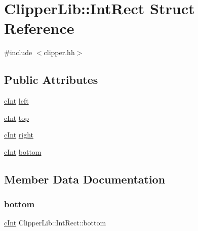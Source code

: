 \hypertarget{struct_clipper_lib_1_1_int_rect}{}\section{Clipper\+Lib\+::Int\+Rect Struct Reference}
\label{struct_clipper_lib_1_1_int_rect}


{\ttfamily \#include $<$clipper.\+hh$>$}

\subsection*{Public Attributes}
\begin{DoxyCompactItemize}
\item 
\mbox{\hyperlink{namespace_clipper_lib_a7156730a24951629192d4831334bafaa}{c\+Int}} \mbox{\hyperlink{struct_clipper_lib_1_1_int_rect_a9bf519994ffc7d1d5752fb1e2411b4cd}{left}}
\item 
\mbox{\hyperlink{namespace_clipper_lib_a7156730a24951629192d4831334bafaa}{c\+Int}} \mbox{\hyperlink{struct_clipper_lib_1_1_int_rect_a07154695bf2313182400f829ba07c3a9}{top}}
\item 
\mbox{\hyperlink{namespace_clipper_lib_a7156730a24951629192d4831334bafaa}{c\+Int}} \mbox{\hyperlink{struct_clipper_lib_1_1_int_rect_a28c68b5f806a88a187a53f3956954e74}{right}}
\item 
\mbox{\hyperlink{namespace_clipper_lib_a7156730a24951629192d4831334bafaa}{c\+Int}} \mbox{\hyperlink{struct_clipper_lib_1_1_int_rect_a9da9418de5faa7eba55e8ee98a13ea0e}{bottom}}
\end{DoxyCompactItemize}


\subsection{Member Data Documentation}
\mbox{\label{struct_clipper_lib_1_1_int_rect_a9da9418de5faa7eba55e8ee98a13ea0e}} 
\subsubsection{\texorpdfstring{bottom}{bottom}}
{\footnotesize\ttfamily \mbox{\hyperlink{namespace_clipper_lib_a7156730a24951629192d4831334bafaa}{c\+Int}} Clipper\+Lib\+::\+Int\+Rect\+::bottom}

